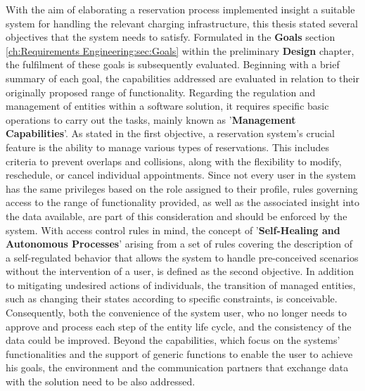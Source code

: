 With the aim of elaborating a reservation process implemented insight a suitable system for handling the relevant charging infrastructure, this thesis stated several objectives that the system needs to satisfy. 
Formulated in the \textbf{Goals} section \ref{ch:Requirements Engineering:sec:Goals} within the preliminary \textbf{Design} chapter, the fulfilment of these goals is subsequently evaluated.
Beginning with a brief summary of each goal, the capabilities addressed are evaluated in relation to their originally proposed range of functionality.
Regarding the regulation and management of entities within a software solution, it requires specific basic operations to carry out the tasks, mainly known as '\textbf{Management Capabilities}'.
As stated in the first objective, a reservation system's crucial feature is the ability to manage various types of reservations. This includes criteria to prevent overlaps and collisions, along with the flexibility to modify, reschedule, or cancel individual appointments.
Since not every user in the system has the same privileges based on the role assigned to their profile, rules governing access to the range of functionality provided, as well as the associated insight into the data available, are part of this consideration and should be enforced by the system.
With access control rules in mind, the concept of '\textbf{Self-Healing and Autonomous Processes}' arising from a set of rules covering the description of a self-regulated behavior that allows the system to handle pre-conceived scenarios without the intervention of a user, is defined as the second objective. 
In addition to mitigating undesired actions of individuals, the transition of managed entities, such as changing their states according to specific constraints, is conceivable.
Consequently, both the convenience of the system user, who no longer needs to approve and process each step of the entity life cycle, and the consistency of the data could be improved.
Beyond the capabilities, which focus on the systems' functionalities and the support of generic functions to enable the user to achieve his goals, the environment and the communication partners that exchange data with the solution need to be also addressed.
